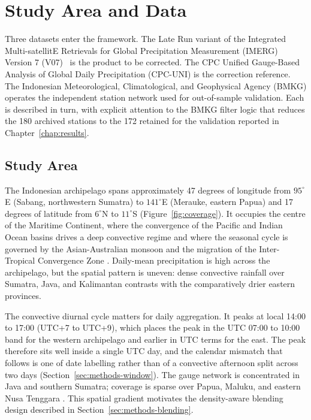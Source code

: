 \section{Study Area and Data}\label{sec:methods-data}

Three datasets enter the framework. The Late Run variant of the
Integrated Multi-satellitE Retrievals for Global Precipitation
Measurement (IMERG) Version 7 (V07)~\citep{ref:huffman2020} is
the product to be corrected. The CPC Unified Gauge-Based Analysis of Global Daily
Precipitation (CPC-UNI) is the correction reference. The
Indonesian Meteorological, Climatological, and Geophysical Agency
(BMKG) operates the independent station network used for
out-of-sample validation. Each is described in turn, with explicit
attention to the BMKG filter logic that reduces the 180 archived
stations to the 172 retained for the validation reported in
Chapter~\ref{chap:results}.

\subsection{Study Area}

The Indonesian archipelago spans approximately 47 degrees of
longitude from $95^{\circ}$E (Sabang, northwestern Sumatra) to
$141^{\circ}$E (Merauke, eastern Papua) and 17 degrees of
latitude from $6^{\circ}$N to $11^{\circ}$S
(Figure~\ref{fig:coverage}). It occupies the
centre of the Maritime Continent, where the convergence of the
Pacific and Indian Ocean basins drives a deep convective regime
and where the seasonal cycle is governed by the
Asian-Australian monsoon and the migration of the Inter-Tropical
Convergence Zone \citep{ref:aldrian2003}. Daily-mean precipitation is
high across the archipelago, but the spatial pattern is uneven:
dense convective rainfall over Sumatra, Java, and Kalimantan
contrasts with the comparatively drier eastern provinces.

The convective diurnal cycle matters for daily aggregation. It
peaks at local 14:00 to 17:00 (UTC+7 to
UTC+9), which places the peak in the UTC 07:00 to 10:00 band for
the western archipelago and earlier in UTC terms for the east. The
peak therefore sits well inside a single UTC day, and the calendar
mismatch that follows is one of date labelling rather than of a
convective afternoon split across two days
(Section~\ref{sec:methods-window}). The gauge
network is concentrated in Java and southern Sumatra; coverage is
sparse over Papua, Maluku, and eastern Nusa Tenggara
\citep{ref:chen2008}. This spatial gradient motivates the
density-aware blending design described in
Section~\ref{sec:methods-blending}.

